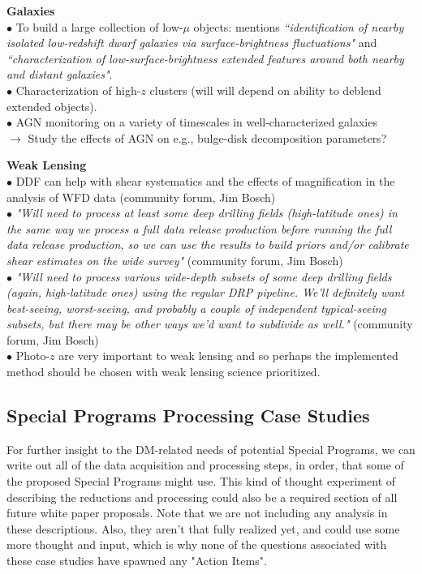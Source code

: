 \documentclass[DM,lsstdraft,toc]{lsstdoc}
\begin{document}
\noindent \textbf{Galaxies} \\
$\bullet$ To build  a large collection of low-$\mu$ objects: \cite{FergusonWP} mentions {\it ``identification of nearby isolated low-redshift dwarf galaxies via surface-brightness fluctuations"} and {\it ``characterization of low-surface-brightness extended features around both nearby and distant galaxies"}. \\
$\bullet$ Characterization of high-$z$ clusters (will will depend on ability to deblend extended objects). \\
$\bullet$ AGN monitoring on a variety of timescales in well-characterized galaxies \citep{FergusonWP}  \citep{GawiserWP} \\
$\rightarrow$ Study the effects of AGN on e.g., bulge-disk decomposition parameters?

\noindent \textbf{Weak Lensing} \\
$\bullet$ DDF can help with shear systematics and the effects of magnification in the analysis of WFD data (community forum, Jim Bosch) \\
$\bullet$ {\it "Will need to process at least some deep drilling fields (high-latitude ones) in the same way we process a full data release production before running the full data release production, so we can use the results to build priors and/or calibrate shear estimates on the wide survey"} (community forum, Jim Bosch) \\
$\bullet$ {\it "Will need to process various wide-depth subsets of some deep drilling fields (again, high-latitude ones) using the regular DRP pipeline. We'll definitely want best-seeing, worst-seeing, and probably a couple of independent typical-seeing subsets, but there may be other ways we'd want to subdivide as well."} (community forum, Jim Bosch)  \\
$\bullet$ Photo-$z$ are very important to weak lensing \citep{MaWP} and so perhaps the implemented method should be chosen with weak lensing science prioritized.




\subsection{Special Programs Processing Case Studies}\label{ssec:science_dmsums}

For further insight to the DM-related needs of potential Special Programs, we can write out all of the data acquisition and processing steps, in order, that some of the proposed Special Programs might use. This kind of thought experiment of describing the reductions and processing could also be a required section of all future white paper proposals. Note that we are not including any analysis in these descriptions. Also, they aren't that fully realized yet, and could use some more thought and input, which is why none of the questions associated with these case studies have spawned any "Action Items".
\end{document}
